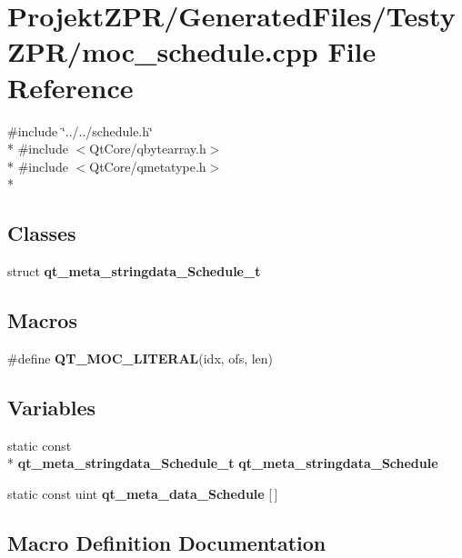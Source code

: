 \section{Projekt\-Z\-P\-R/\-Generated\-Files/\-Testy\-Z\-P\-R/moc\-\_\-schedule.cpp File Reference}
\label{_testy_z_p_r_2moc__schedule_8cpp}
{\ttfamily \#include \char`\"{}../../schedule.\-h\char`\"{}}\\*
{\ttfamily \#include $<$Qt\-Core/qbytearray.\-h$>$}\\*
{\ttfamily \#include $<$Qt\-Core/qmetatype.\-h$>$}\\*
\subsection*{Classes}
\begin{DoxyCompactItemize}
\item 
struct {\bf qt\-\_\-meta\-\_\-stringdata\-\_\-\-Schedule\-\_\-t}
\end{DoxyCompactItemize}
\subsection*{Macros}
\begin{DoxyCompactItemize}
\item 
\#define {\bf Q\-T\-\_\-\-M\-O\-C\-\_\-\-L\-I\-T\-E\-R\-A\-L}(idx, ofs, len)
\end{DoxyCompactItemize}
\subsection*{Variables}
\begin{DoxyCompactItemize}
\item 
static const \\*
{\bf qt\-\_\-meta\-\_\-stringdata\-\_\-\-Schedule\-\_\-t} {\bf qt\-\_\-meta\-\_\-stringdata\-\_\-\-Schedule}
\item 
static const uint {\bf qt\-\_\-meta\-\_\-data\-\_\-\-Schedule} [$\,$]
\end{DoxyCompactItemize}


\subsection{Macro Definition Documentation}

